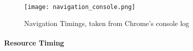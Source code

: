 
\begin{figure}[h!]
\begin{center}
\texttt{[image: navigation\_console.png]}
\caption{Navigation Timings, taken from Chrome's console log}
\label{figure:navigation_console}
\end{center}
\end{figure}







\paragraph{Resource Timing} %


